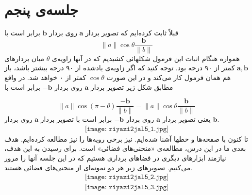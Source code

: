 \documentclass[12pt,a4paper]{article}
\theoremstyle{definition}
\begin{document}
\section{جلسه‌ی پنجم}
قبلاً ثابت کرده‌ایم که تصویر بردار
$\mathbf{a}$
روی بردار
$\mathbf{b}$
برابر است با
\[
\|a\| \cos \theta \frac{\mathbf{b}}{\|b\|}
\]
همواره هنگام اثبات این فرمول شکلهائی کشیدیم که در آنها زاویه‌ی
$\theta$
میان بردارهای
$\mathbf{a},\mathbf{b}$
کمتر از ۹۰ درجه بود. توجه کنید که اگر زاویه‌ی
یادشده از ۹۰ درجه بیشتر باشد، باز هم همان فرمول کار می‌کند و در این صورت
$\cos \theta$
کمتر از ۰ خواهد شد. در واقع مطابق شکل زیر
تصویر بردار 
$\mathbf{a}$
روی بردار
$\mathbf{-b}$
برابر است با

\[
\|a\| \cos (\pi-\theta) \frac{\mathbf{-b}}{\|b\|}=\|a\| \cos \theta \frac{\mathbf{b}}{\|b\|}
\]
یعنی
تصویر بردار 
$\mathbf{a}$
روی بردار
$\mathbf{-b}$
برابر است با
تصویر بردار 
$\mathbf{a}$
روی بردار
$\mathbf{b}$.
\begin{align*}
\texttt{[image: riyazi2jal5\_1.jpg]}
\end{align*}
تا کنون با صفحه‌ها و خطها آشنا شده‌ایم. نیز برخی رویه‌ها را نیز مطالعه کرده‌ایم. هدف بعدی ما در این درس، مطالعه‌ی «منحنی‌های فضائی» است.  برای رسیدن به این هدف، نیازمند 
ابزارهای دیگری در فضاهای برداری هستیم که در این جلسه آنها را مرور می‌کنیم.  تصویرهای زیر هر دو نمونه‌ای از منحنی‌های فضائی هستند. 
\begin{align*}
\texttt{[image: riyazi2jal5\_2.jpg]}
\end{align*}
\begin{align*}
\texttt{[image: riyazi2jal5\_3.jpg]}
\end{align*}
\end{document}
